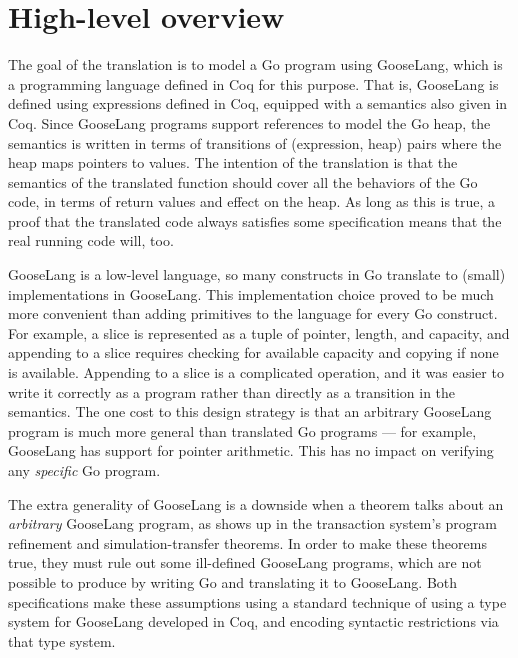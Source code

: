 \section{High-level overview}

The goal of the translation is to model a Go program using GooseLang,
which is a programming language defined in Coq for this purpose. That is,
GooseLang is defined using expressions defined in Coq, equipped with a
semantics also given in Coq. Since GooseLang programs support references
to model the Go heap, the semantics is written in terms of transitions
of (expression, heap) pairs where the heap maps pointers to values. The
intention of the translation is that the semantics of the translated
function should cover all the behaviors of the Go code, in terms of
return values and effect on the heap. As long as this is true, a proof
that the translated code always satisfies some specification means that
the real running code will, too.

GooseLang is a low-level language, so many constructs in Go translate to
(small) implementations in GooseLang. This implementation choice proved
to be much more convenient than adding primitives to the language for
every Go construct. For example, a slice is represented as a tuple of
pointer, length, and capacity, and appending to a slice requires
checking for available capacity and copying if none is available.
Appending to a slice is a complicated operation, and it was easier to
write it correctly as a program rather than directly as a transition in
the semantics. The one cost to this design strategy is that an arbitrary
GooseLang program is much more general than translated Go programs --- for
example, GooseLang has support for pointer arithmetic. This
has no impact on verifying any \emph{specific} Go program.

The extra generality of GooseLang is a downside when a theorem talks about an
\emph{arbitrary} GooseLang program, as shows up in the transaction system's
program refinement and simulation-transfer theorems. In order to make these
theorems true, they must rule out
some ill-defined GooseLang programs, which are
not possible to produce by writing Go and translating it to GooseLang. Both
specifications make these assumptions using a
standard technique of using a type system for GooseLang developed in Coq, and encoding
syntactic restrictions via that type system.


